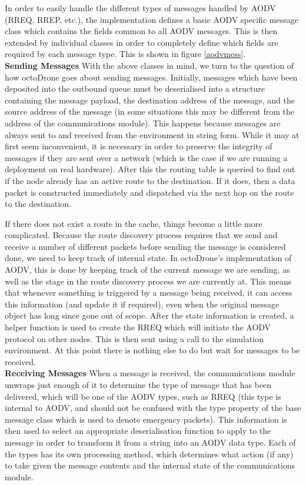 In order to easily handle the different types of messages handled by AODV (RREQ, RREP, etc.), the implementation defines a basic AODV specific message class which contains the fields common to all AODV messages. This is then extended by individual classes in order to completely define which fields are required by each message type. This is shown in figure \ref{aodvmess}.\\

\noindent\textbf{Sending Messages}
With the above classes in mind, we turn to the question of how octoDrone goes about sending messages. Initially, messages which have been deposited into the outbound queue must be deserialised into a structure containing the message payload, the destination address of the message, and the source address of the message (in some situations this may be different from the address of the communications module). This happens because messages are always sent to and received from the environment in string form. While it may at first seem inconvenient, it is necessary in order to preserve the integrity of messages if they are sent over a network (which is the case if we are running a deployment on real hardware). After this the routing table is queried to find out if the node already has an active route to the destination. If it does, then a data packet is constructed immediately and dispatched via the next hop on the route to the destination.

If there does not exist a route in the cache, things become a little more complicated. Because the route discovery process requires that we send and receive a number of different packets before sending the message is considered done, we need to keep track of internal state. In octoDrone's implementation of AODV, this is done by keeping track of the current message we are sending, as well as the stage in the route discovery process we are currently at. This means that whenever something is triggered by a message being received, it can access this information (and update it if required), even when the original message object has long since gone out of scope. After the state information is created, a helper function is used to create the RREQ which will initiate the AODV protocol on other nodes. This is then sent using a call to the simulation environment. At this point there is nothing else to do but wait for messages to be received.\\

\noindent\textbf{Receiving Messages}
When a message is received, the communications module unwraps just enough of it to determine the type of message that has been delivered, which will be one of the AODV types, such as RREQ (this type is internal to AODV, and should not be confused with the type property of the base message class which is used to denote emergency packets). This information is then used to select an appropriate deserialisation function to apply to the message in order to transform it from a string into an AODV data type. Each of the types has its own processing method, which determines what action (if any) to take given the message contents and the internal state of the communications module.

